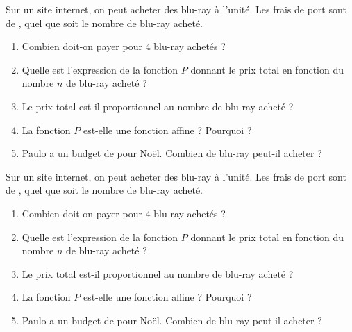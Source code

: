 \documentclass[10pt,openright,twoside,french]{book}
\begin{document}
\hrulefill\bigskip

Sur un site internet, on peut acheter des blu-ray à  l'unité. Les frais de port sont de , quel que soit le nombre de blu-ray acheté.
\begin{enumerate}
    \item Combien doit-on payer pour $4$ blu-ray achetés ?
    \item Quelle est l'expression de la fonction $P$ donnant le prix total en fonction du nombre $n$ de blu-ray acheté ?
    \item Le prix total est-il proportionnel au nombre de blu-ray acheté ?
    \item La fonction $P$ est-elle une fonction affine ? Pourquoi ?
    \item Paulo a un budget de  pour Noël. Combien de blu-ray peut-il acheter ?
\end{enumerate}\bigskip

\hrulefill\bigskip

Sur un site internet, on peut acheter des blu-ray à  l'unité. Les frais de port sont de , quel que soit le nombre de blu-ray acheté.
\begin{enumerate}
    \item Combien doit-on payer pour $4$ blu-ray achetés ?
    \item Quelle est l'expression de la fonction $P$ donnant le prix total en fonction du nombre $n$ de blu-ray acheté ?
    \item Le prix total est-il proportionnel au nombre de blu-ray acheté ?
    \item La fonction $P$ est-elle une fonction affine ? Pourquoi ?
    \item Paulo a un budget de  pour Noël. Combien de blu-ray peut-il acheter ?
\end{enumerate}
\end{document}
